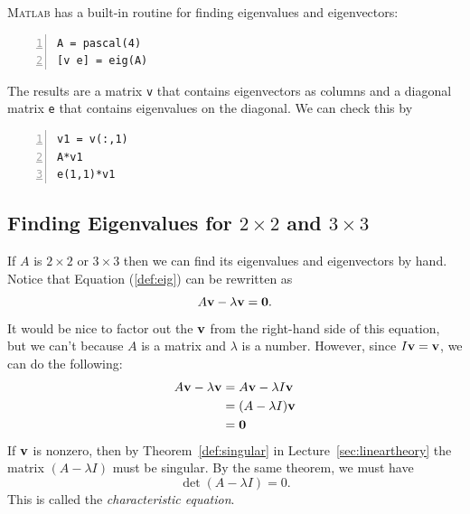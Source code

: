 \textsc{Matlab} has a built-in routine for finding eigenvalues and eigenvectors:
\begin{lstlisting}[frame=none,numbers=left]
A = pascal(4)
[v e] = eig(A)
\end{lstlisting}
The results are a matrix \verb&v& that contains eigenvectors as
columns and a diagonal matrix \verb&e& that contains eigenvalues on
the diagonal. We can check this by
\begin{lstlisting}[frame=none,numbers=left]
v1 = v(:,1)
A*v1
e(1,1)*v1
\end{lstlisting}


\subsection*{Finding Eigenvalues for $2\times 2$ and $3\times3$}


If $A$ is $2\times 2$ or $3\times3$ then we can find its eigenvalues
and eigenvectors by hand. Notice that Equation (\ref{def:eig})
can be rewritten as
\begin{equation*}
     A \mathbf{v} - \lambda \mathbf{v} = \mathbf{0}.
\end{equation*}
It would be nice to factor out the $\mathbf{v}$ from the right-hand side of this
equation, but we can't because $A$ is a matrix and $\lambda$ is a number.
However, since $I \mathbf{v} = \mathbf{v}$, we can do the following:
\begin{equation*}
\begin{split}
A\mathbf{v} - \lambda \mathbf{v} &=    A \mathbf{v} - \lambda I \mathbf{v} \\
                   &= (A  - \lambda I) \mathbf{v} \\
                   &= \mathbf{0}
\end{split}
\end{equation*}
If $\mathbf{v}$ is nonzero, then by Theorem~\ref{def:singular} in
Lecture~\ref{sec:lineartheory} the matrix $(A - \lambda I)$ must be
singular. By the same theorem, we must have
\begin{equation*}%
         \det(A - \lambda I) = 0.
\end{equation*}
This is called the {\em characteristic equation}.

